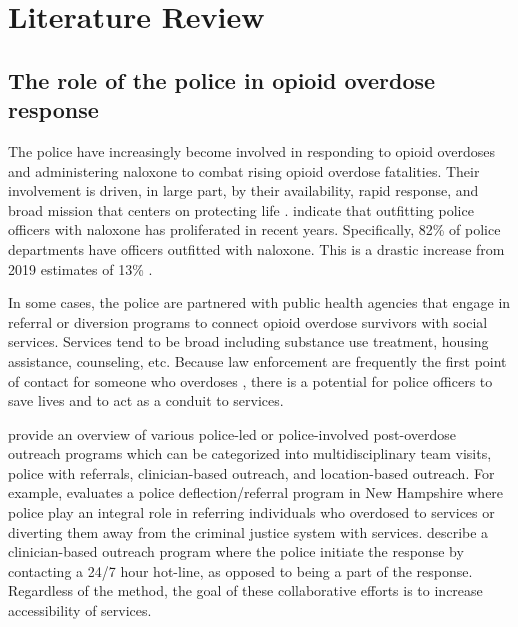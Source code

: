 \section{Literature Review}
\subsection{The role of the police in opioid overdose response}
The police have increasingly become involved in responding to opioid overdoses and administering naloxone to combat rising opioid overdose fatalities. Their involvement is driven, in large part, by their availability, rapid response, and broad mission that centers on protecting life \parencite{skolnick_above_1993}. \textcite{ray_national_2023} indicate that outfitting police officers with naloxone has proliferated in recent years. Specifically, 82\% of police departments have officers outfitted with naloxone. This is a drastic increase from 2019 estimates of 13\% \parencite{quinn_most_2019}.

In some cases, the police are partnered with public health agencies that engage in referral or diversion programs to connect opioid overdose survivors with social services. Services tend to be broad including substance use treatment, housing assistance, counseling, etc. Because law enforcement are frequently the first point of contact for someone who overdoses \parencite{beletsky_police_2011, silverman_harmonizing_2012}, there is a potential for police officers to save lives and to act as a conduit to services. 

\textcite{formica_characteristics_2021} provide an overview of various police-led or police-involved post-overdose outreach programs which can be categorized into multidisciplinary team visits, police with referrals, clinician-based outreach, and location-based outreach. For example, \textcite{donnelly_law_2022} evaluates a police deflection/referral program in New Hampshire where police play an integral role in referring individuals who overdosed to services or diverting them away from the criminal justice system with services. \textcite{dahlem_recovery_2021} describe a clinician-based outreach program where the police initiate the response by contacting a 24/7 hour hot-line, as opposed to being a part of the response. Regardless of the method, the goal of these collaborative efforts is to increase accessibility of services.

